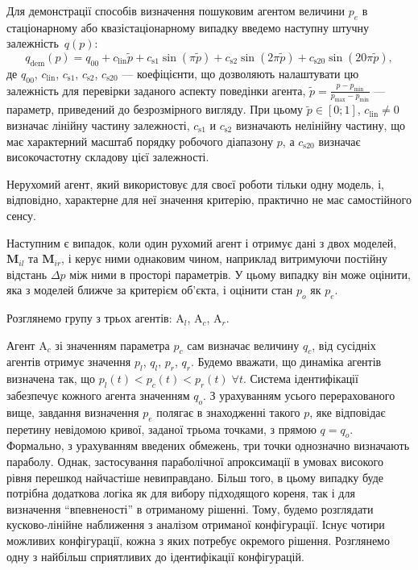 \documentclass[a4paper,13pt]{atuaref}
\begin{document}
Для демонстрації способів визначення пошуковим агентом величини $ p_e $ в
стаціонарному або квазістаціонарному випадку введемо наступну штучну залежність~$q(p)$:
%
\begin{equation}
  q_\mathrm{dem}(p) = q_{00} + c_\mathrm{lin} \tilde{p} + c_\mathrm{s1} \sin( \pi \tilde{p} ) + c_\mathrm{s2} \sin( 2 \pi \tilde{p} ) + c_\mathrm{s20} \sin( 20 \pi \tilde{p} ),
  \label{atu:eq:q_dem}
\end{equation}
%
де $q_{00}$, $c_\mathrm{lin}$, $c_\mathrm{s1}$, $c_\mathrm{s2}$, $c_\mathrm{s20}$
---
коефіцієнти, що дозволяють налаштувати цю залежність для перевірки заданого аспекту поведінки агента,
$ \tilde{p} = \frac{p - p_{\min}}{p_{\max} - p_{\min}} $
---
параметр, приведений до безрозмірного вигляду.
При цьому $\tilde{p} \in[0;1]$, $c_\mathrm{lin} \ne 0$
визначає лінійну частину залежності,
$c_\mathrm{s1}$ и $c_\mathrm{s2}$
визначають нелінійну частину, що має характерний масштаб порядку робочого діапазону $p$,
а $c_\mathrm{s20}$ визначає високочастотну складову цієї залежності.

Нерухомий агент, який використовує для своєї роботи тільки одну модель, і,
відповідно, характерне для неї значення критерію, практично не має самостійного
сенсу.


Наступним є випадок, коли один рухомий агент і отримує дані з двох моделей,
$ \mathbf{M}_{il}$ та
$ \mathbf{M}_{ir}$,
і керує ними однаковим чином, наприклад витримуючи постійну відстань
$ \Delta p $ між ними в просторі параметрів. У цьому випадку він може оцінити, яка з
моделей ближче за критерієм об'єкта, і оцінити стан $ p_o $ як $ p_e $.


Розглянемо групу з трьох агентів:
$\mathrm{A}_l$,
$\mathrm{A}_c$,
$\mathrm{A}_r$.

Агент $ \mathrm {A} _c $ зі значенням параметра $ p_c $ сам визначає величину
$ q_c $, від сусідніх агентів отримує значення $ p_l $, $ q_l $, $ p_r $, $ q_r$.
Будемо вважати, що динаміка агентів визначена так, що $ p_l (t) <p_c (t)<p_r (t) \; \forall t $.
Система ідентифікації забезпечує кожного агента
значенням $ q_o $. З урахуванням усього перерахованого вище, завдання
визначення $ p_e $ полягає в знаходженні такого $ p $, яке відповідає перетину
невідомою кривої, заданої трьома точками, з прямою $ q = q_o $.
Формально, з урахуванням введених обмежень, три точки однозначно визначають параболу. Однак,
застосування параболічної апроксимації в умовах високого рівня перешкод
найчастіше невиправдано. Більш того, в цьому випадку буде потрібна додаткова
логіка як для вибору підходящого кореня, так і для визначення ``впевненості''
в отриманому рішенні. Тому, будемо розглядати кусково-лінійне наближення з
аналізом отриманої конфігурації. Існує чотири можливих конфігурації,
кожна з яких потребує окремого рішення. Розглянемо одну з найбільш
сприятливих до ідентифікації конфігурацій.
\end{document}
